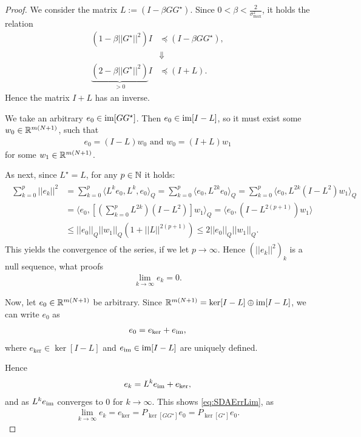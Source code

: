 \begin{proof}
	We consider the matrix $L:= ( I -\beta G G^\star)$. Since $0 <\beta < \frac{2}{\sigma_{\max}^2}$, it holds the relation
	\begin{align}
	(1 - \beta || G^\star ||^2 )I &\preceq (I - \beta G G^\star),\\
	&\Downarrow\\
	\label{eq:alg:proof1}
	\underbrace{(2 - \beta ||G^\star||^2)}_{> 0} I &\preceq (I + L).
	\end{align}
	Hence the matrix $I + L$ has an inverse.
	 
	We take an arbitrary $e_0 \in \operatorname{im} [G G^\star]$. Then $e_0 \in \operatorname{im} [I - L]$, so it must exist some $w_0 \in {\mathbb{R}}^{m (N+1)}$, such that 
	\begin{align}
	e_0 = (I - L)w_0 \text{ and } w_0 = (I + L)w_1
	\end{align}
	for some $w_1 \in {\mathbb{R}}^{m(N+1)}$. 
	
	As next, since $L^\star = L$, for any $p \in {\mathbb{N}}$ it holds: 
	\begin{align}
\begin{split}
	\sum_{k = 0}^p ||e_k||^2 &= \sum_{k = 0}^p \langle L^k e_0, L^k, e_0  \rangle_Q = \sum_{k = 0}^p\langle e_0 , L^{2k}e_0\rangle_Q = \sum_{k = 0}^p \langle e_0, L^{2k} (I - L^2) w_1 \rangle_Q \\
	&= \langle e_0, \left[\left(\sum_{k = 0}^p L^{2k}\right) (I - L^2)\right]w_1\rangle_Q = \langle e_0 , \left( I - L^{2(p+1)}\right)w_1\rangle \\
	&\leq ||e_0||_Q ||w_1||_Q \left(1 + ||L||^{2(p+1)}\right) \leq 2 ||e_0||_Q ||w_1||_Q.
\end{split}	\end{align}
This yields the convergence of the series, if we let  $p \to \infty$. Hence $\left(||e_k||^2\right)_k$ is a null sequence, what proofs  
	\begin{align}
	\lim_{k \to \infty}e_k = 0.
	\end{align}
	
	Now, let $e_0 \in {\mathbb{R}}^{m(N+1)}$ be arbitrary. Since ${\mathbb{R}}^{m ( N+1)} = \ker [I - L] \oplus \operatorname{im} [I - L]$, we can write $e_0$ as 
	\begin{align}
	e_0 = e_{\ker} + e_{\operatorname{im}},
	\end{align}
	where $e_{\ker} \in \ker [I - L]$ and $e_{\operatorname{im}} \in \operatorname{im} [I - L]$ are uniquely defined.
	
	Hence 
	\begin{align}
	e_k = L^ke_{\operatorname{im}} + e_{\ker},
	\end{align}
	and as $L^ke_{\operatorname{im}}$ converges to 0 for $k \to \infty$.
	This shows \eqref{eq:SDAErrLim}, as  
	\begin{align}
	\lim_{k \to \infty} e_k = e_{\ker} = P_{\ker[GG^\star]}e_0 = P_{\ker[G^\star]}e_0.
	\end{align}	
\end{proof}

